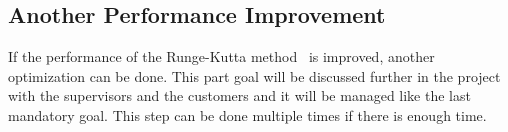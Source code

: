 \subsection{Another Performance Improvement}
\label{spec:ch:goals:optional-requirements:another-performance-improvement}

If the performance of the Runge-Kutta method~\cite{Runge-Kutta-methods} is improved, another optimization can be done.
This part goal will be discussed further in the project with the supervisors and the customers and it will be managed like the last mandatory goal.
This step can be done multiple times if there is enough time.

